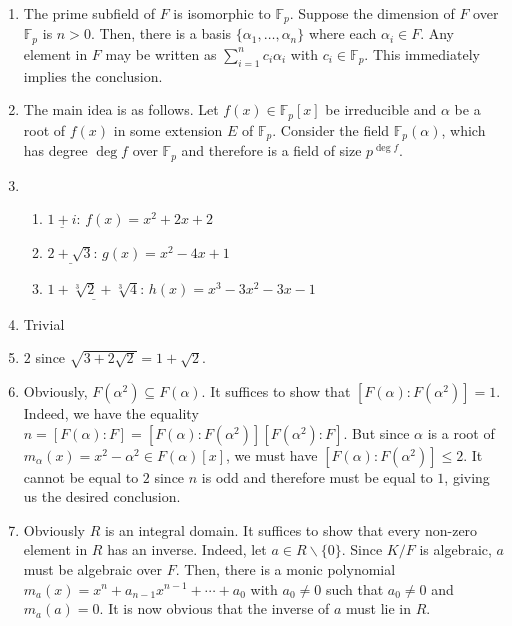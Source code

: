 \documentclass[12pt]{article}
\newcommand{\F}{\mathbb{F}}
\newcommand{\setItemnumber}[1]{\setcounter{enumi}{\numexpr#1-1\relax}}
\begin{document}
\begin{enumerate}
    \item The prime subfield of $F$ is isomorphic to $\F_p$. Suppose the dimension of $F$ over $\F_p$ is $n > 0$. Then, there is a basis $\{\alpha_1,\ldots,\alpha_n\}$ where each $\alpha_i\in F$. Any element in $F$ may be written as $\sum_{i = 1}^nc_i\alpha_i$ with $c_i\in\F_p$. This immediately implies the conclusion.

    \item The main idea is as follows. Let $f(x)\in\F_p[x]$ be irreducible and $\alpha$ be a root of $f(x)$ in some extension $E$ of $\F_p$. Consider the field $\F_p(\alpha)$, which has degree $\deg f$ over $\F_p$ and therefore is a field of size $p^{\deg f}$.

    \item 
    \begin{enumerate}
        \item $\underline{1 + i}$: $f(x) = x^2 + 2x + 2$ 
        \item $\underline{2 + \sqrt{3}}$: $g(x) = x^2 - 4x + 1$
        \item $\underline{1 + \sqrt[3]{2} + \sqrt[3]{4}}$: $h(x) = x^3 - 3x^2 - 3x - 1$
    \end{enumerate}

    \setItemnumber{5}
    \item Trivial 
    
    \item $2$ since $\sqrt{3 + 2\sqrt{2}} = 1 + \sqrt{2}$.

    \item Obviously, $F(\alpha^2)\subseteq F(\alpha)$. It suffices to show that $[F(\alpha):F(\alpha^2)] = 1$. Indeed, we have the equality $n = [F(\alpha):F] = [F(\alpha):F(\alpha^2)][F(\alpha^2):F]$. But since $\alpha$ is a root of $m_\alpha(x) = x^2 - \alpha^2\in F(\alpha)[x]$, we must have $[F(\alpha):F(\alpha^2)]\le 2$. It cannot be equal to $2$ since $n$ is odd and therefore must be equal to $1$, giving us the desired conclusion.

    \item Obviously $R$ is an integral domain. It suffices to show that every non-zero element in $R$ has an inverse. Indeed, let $a\in R\backslash\{0\}$. Since $K/F$ is algebraic, $a$ must be algebraic over $F$. Then, there is a monic polynomial $m_a(x) = x^n + a_{n - 1}x^{n - 1} + \cdots + a_0$ with $a_0\ne 0$ such that $a_0\ne 0$ and $m_a(a) = 0$. It is now obvious that the inverse of $a$ must lie in $R$.


\end{enumerate}
\end{document}
